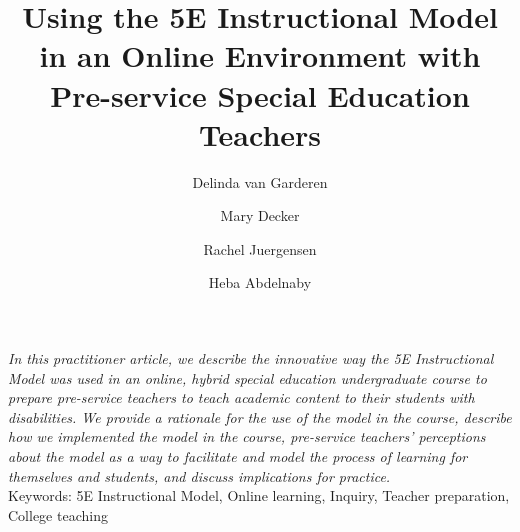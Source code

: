 \documentclass[11.5pt]{sig-alternate} %
\makeatletter
\let\oldabstract\abstract
\let\oldendabstract\endabstract
\renewenvironment{abstract}
{\renewenvironment{quotation}%
               {\list{}{\addtolength{\leftmargin}{1em} %
                        \listparindent 1.5em%
                        \itemindent    \listparindent%
                        \rightmargin   \leftmargin%
                        \parsep        \z@ \@plus\p@}%
                \item\relax}%
               {\endlist}%
\oldabstract}
{\oldendabstract}
\makeatother
\begin{document}
\title{Using the 5E Instructional Model in an Online Environment with Pre-service Special Education Teachers}

\author[1]{\large \color{blue}Delinda van Garderen}
\author[1]{\large \color{blue}Mary Decker}
\author[1]{\large \color{blue}Rachel Juergensen}
\author[1]{\large \color{blue}Heba Abdelnaby}

\toappear{}
\maketitle
\begin{@twocolumnfalse} 
\begin{abstract}
\item 
\begin{large}
\textit{In this practitioner article, we describe the innovative way the 5E Instructional Model was used in an online, hybrid special education undergraduate course to prepare pre-service teachers to teach academic content to their students with disabilities. We provide a rationale for the use of the model in the course, describe how we implemented the model in the course, pre-service teachers’ perceptions about the model as a way to facilitate and model the process of learning for themselves and students, and discuss implications for practice.} \\

Keywords: 5E Instructional Model, Online learning, Inquiry, Teacher preparation, College teaching

\end{large}
\end{abstract}
\end{@twocolumnfalse}

\end{document}
